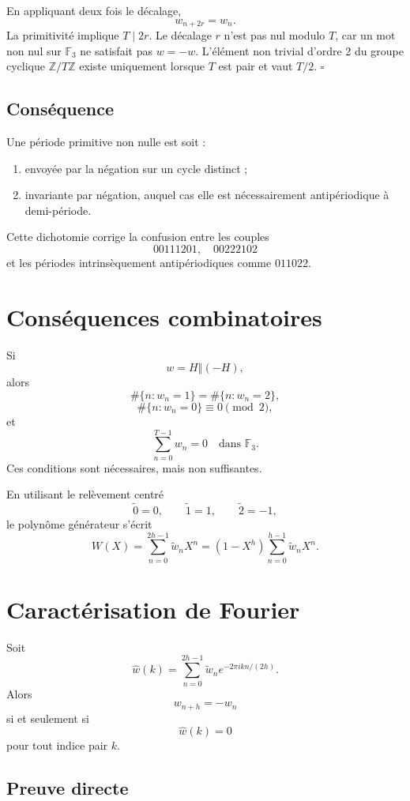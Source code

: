 \documentclass[11pt,a4paper]{article}
\newcommand{\F}{\mathbb F}
\newcommand{\Z}{\mathbb Z}
\newcommand{\concat}{\mathbin{\Vert}}
\begin{document}
En appliquant deux fois le décalage,
\[
w_{n+2r}=w_n.
\]
La primitivité implique \(T\mid 2r\). Le décalage \(r\) n'est pas nul
modulo \(T\), car un mot non nul sur \(\F_3\) ne satisfait pas \(w=-w\).
L'élément non trivial d'ordre 2 du groupe cyclique \(\Z/T\Z\) existe
uniquement lorsque \(T\) est pair et vaut \(T/2\). \hfill\(\square\)

\subsection*{Conséquence}

Une période primitive non nulle est soit :
\begin{enumerate}
\item envoyée par la négation sur un cycle distinct ;
\item invariante par négation, auquel cas elle est nécessairement
antipériodique à demi-période.
\end{enumerate}

Cette dichotomie corrige la confusion entre les couples
\[
00111201,\quad 00222102
\]
et les périodes intrinsèquement antipériodiques comme \(011022\).

\section{Conséquences combinatoires}

Si
\[
w=H\concat(-H),
\]
alors
\[
\#\{n:w_n=1\}=\#\{n:w_n=2\},
\]
\[
\#\{n:w_n=0\}\equiv0\pmod2,
\]
et
\[
\sum_{n=0}^{T-1}w_n=0
\quad\text{dans }\F_3.
\]
Ces conditions sont nécessaires, mais non suffisantes.

En utilisant le relèvement centré
\[
\widetilde 0=0,\qquad
\widetilde 1=1,\qquad
\widetilde 2=-1,
\]
le polynôme générateur s'écrit
\[
W(X)
=\sum_{n=0}^{2h-1}\widetilde w_nX^n
=(1-X^h)\sum_{n=0}^{h-1}\widetilde w_nX^n.
\]

\section{Caractérisation de Fourier}

Soit
\[
\widehat w(k)
=\sum_{n=0}^{2h-1}
\widetilde w_n e^{-2\pi i kn/(2h)}.
\]
Alors
\[
w_{n+h}=-w_n
\]
si et seulement si
\[
\widehat w(k)=0
\]
pour tout indice pair \(k\).

\subsection*{Preuve directe}
\end{document}
